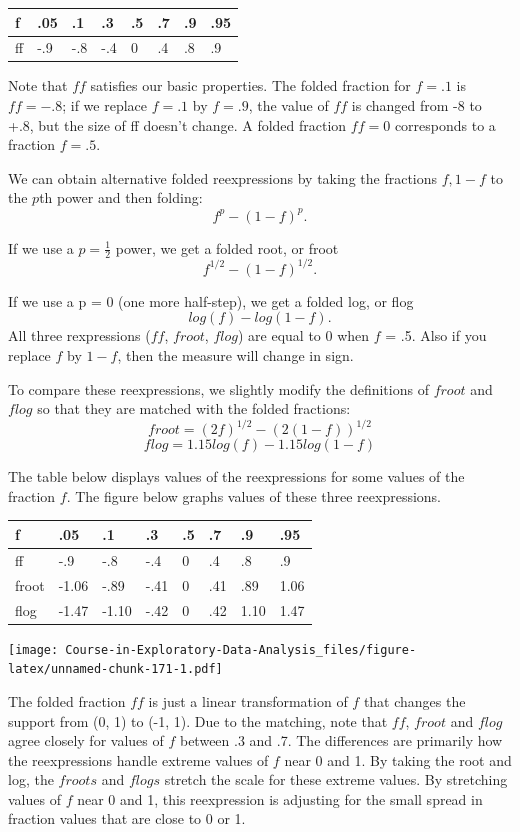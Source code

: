 \documentclass[
]{book}
\begin{document}
\begin{longtable}[]{@{}llllllll@{}}
\toprule
f & .05 & .1 & .3 & .5 & .7 & .9 & .95 \\
\midrule
\endhead
ff & -.9 & -.8 & -.4 & 0 & .4 & .8 & .9 \\
\bottomrule
\end{longtable}

Note that \(ff\) satisfies our basic properties. The folded fraction for \(f = .1\) is \(ff = -.8\); if we replace \(f = .1\) by \(f = .9\), the value of \(ff\) is changed from -8 to +.8, but the size of ff doesn't change. A folded fraction \(ff = 0\) corresponds to a fraction \(f = .5\).

We can obtain alternative folded reexpressions by taking the fractions \(f, 1-f\) to the \(p\)th power and then folding:
\[
f^p - (1-f)^p.
\]

If we use a \(p = \frac{1}{2}\) power, we get a folded root, or froot
\[
f^{1/2} - (1-f)^{1/2}.
\]

If we use a p = 0 (one more half-step), we get a folded log, or flog
\[
log(f) - log(1-f).
\]
All three rexpressions (\(ff\), \(froot\), \(flog\)) are equal to 0 when \(f\) = .5. Also if you replace \(f\) by \(1-f\), then the measure will change in sign.

To compare these reexpressions, we slightly modify the definitions of \(froot\) and \(flog\) so that they are matched with the folded fractions:
\[
froot = (2 f)^{1/2} - (2 (1 - f))^{1/2}
\]
\[
flog = 1.15 log(f) - 1.15 log(1-f)
\]

The table below displays values of the reexpressions for some values of the fraction \(f\). The figure below graphs values of these three reexpressions.

\begin{longtable}[]{@{}llllllll@{}}
\toprule
f & .05 & .1 & .3 & .5 & .7 & .9 & .95 \\
\midrule
\endhead
ff & -.9 & -.8 & -.4 & 0 & .4 & .8 & .9 \\
froot & -1.06 & -.89 & -.41 & 0 & .41 & .89 & 1.06 \\
flog & -1.47 & -1.10 & -.42 & 0 & .42 & 1.10 & 1.47 \\
\bottomrule
\end{longtable}

\texttt{[image: Course-in-Exploratory-Data-Analysis\_files/figure-latex/unnamed-chunk-171-1.pdf]}

The folded fraction \(ff\) is just a linear transformation of \(f\) that changes the support from (0, 1) to (-1, 1). Due to the matching, note that \(ff\), \(froot\) and \(flog\) agree closely for values of \(f\) between .3 and .7. The differences are primarily how the reexpressions handle extreme values of \(f\) near 0 and 1. By taking the root and log, the \(froots\) and \(flogs\) stretch the scale for these extreme values. By stretching values of \(f\) near 0 and 1, this reexpression is adjusting for the small spread in fraction values that are close to 0 or 1.
\end{document}
